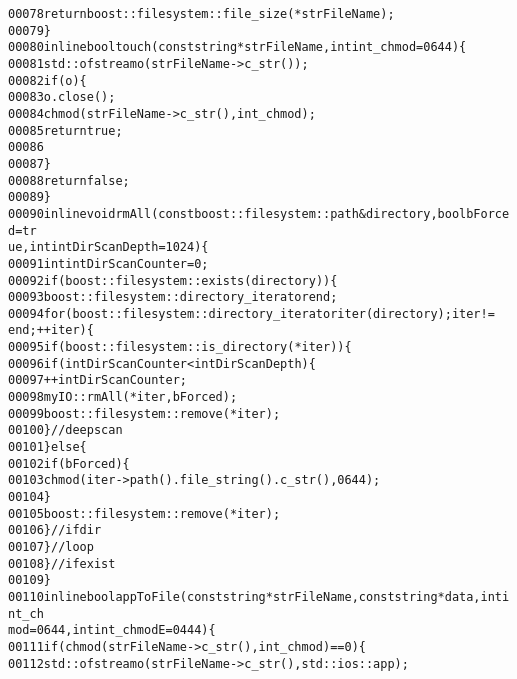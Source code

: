 \begin{footnotesize}
\begin{alltt}
00078         \textcolor{keywordflow}{return} boost::filesystem::file\_size(*strFileName);
00079     \}
00080     \textcolor{keyword}{inline} \textcolor{keywordtype}{bool} touch(\textcolor{keyword}{const} \textcolor{keywordtype}{string} *strFileName,\textcolor{keywordtype}{int} int\_chmod =0644)\{
00081         std::ofstream o(strFileName->c\_str());
00082         \textcolor{keywordflow}{if}(o)\{
00083             o.close();
00084             chmod(strFileName->c\_str(),int\_chmod);
00085             \textcolor{keywordflow}{return} \textcolor{keyword}{true};
00086 
00087         \}
00088         \textcolor{keywordflow}{return} \textcolor{keyword}{false};
00089     \}
00090     \textcolor{keyword}{inline} \textcolor{keywordtype}{void} rmAll(\textcolor{keyword}{const} boost::filesystem::path & directory,\textcolor{keywordtype}{bool} bForced = \textcolor{keyword}{tr
      ue},\textcolor{keywordtype}{int} intDirScanDepth =1024)\{
00091         \textcolor{keywordtype}{int} intDirScanCounter = 0;
00092         \textcolor{keywordflow}{if}( boost::filesystem::exists( directory ) )\{
00093             boost::filesystem::directory\_iterator end ;
00094             \textcolor{keywordflow}{for}( boost::filesystem::directory\_iterator iter(directory) ; iter != 
      end ; ++iter )\{
00095                 \textcolor{keywordflow}{if} ( boost::filesystem::is\_directory( *iter ) )\{
00096                     \textcolor{keywordflow}{if}(intDirScanCounter < intDirScanDepth)\{
00097                         ++intDirScanCounter;
00098                         myIO::rmAll(*iter,bForced);
00099                         boost::filesystem::remove(*iter);
00100                     \}\textcolor{comment}{//deep scan}
00101                 \}\textcolor{keywordflow}{else}\{
00102                     \textcolor{keywordflow}{if} (bForced)\{
00103                         chmod(iter->path().file\_string().c\_str(),0644);
00104                     \}
00105                     boost::filesystem::remove(*iter);
00106                 \}\textcolor{comment}{//if dir}
00107             \}\textcolor{comment}{//loop}
00108         \}\textcolor{comment}{//if exist}
00109     \}
00110     \textcolor{keyword}{inline} \textcolor{keywordtype}{bool} appToFile(\textcolor{keyword}{const} \textcolor{keywordtype}{string} *strFileName,\textcolor{keyword}{const} \textcolor{keywordtype}{string} *data,\textcolor{keywordtype}{int} int\_ch
      mod =0644,\textcolor{keywordtype}{int} int\_chmodE = 0444)\{
00111         \textcolor{keywordflow}{if} (chmod(strFileName->c\_str(),int\_chmod)==0)\{
00112             std::ofstream o(strFileName->c\_str(),std::ios::app);

\end{alltt}
\end{footnotesize}
